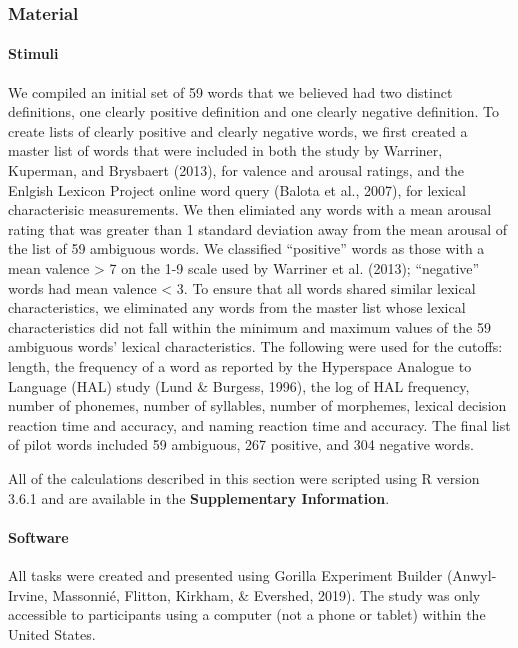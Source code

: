 \documentclass[man]{apa6}
\let\oldparagraph\paragraph
\renewcommand{\paragraph}[1]{\oldparagraph{#1}\mbox{}}
\begin{document}
\hypertarget{material}{%
\subsubsection{Material}\label{material}}

\hypertarget{stimuli}{%
\paragraph{Stimuli}\label{stimuli}}

We compiled an initial set of 59 words that we believed had two distinct definitions, one clearly positive definition and one clearly negative definition. To create lists of clearly positive and clearly negative words, we first created a master list of words that were included in both the study by Warriner, Kuperman, and Brysbaert (2013), for valence and arousal ratings, and the Enlgish Lexicon Project online word query (Balota et al., 2007), for lexical characterisic measurements. We then elimiated any words with a mean arousal rating that was greater than 1 standard deviation away from the mean arousal of the list of 59 ambiguous words. We classified \enquote{positive} words as those with a mean valence \textgreater{} 7 on the 1-9 scale used by Warriner et al. (2013); \enquote{negative} words had mean valence \textless{} 3. To ensure that all words shared similar lexical characteristics, we eliminated any words from the master list whose lexical characteristics did not fall within the minimum and maximum values of the 59 ambiguous words' lexical characteristics. The following were used for the cutoffs: length, the frequency of a word as reported by the Hyperspace Analogue to Language (HAL) study (Lund \& Burgess, 1996), the log of HAL frequency, number of phonemes, number of syllables, number of morphemes, lexical decision reaction time and accuracy, and naming reaction time and accuracy. The final list of pilot words included 59 ambiguous, 267 positive, and 304 negative words.

All of the calculations described in this section were scripted using R version 3.6.1 and are available in the \textbf{Supplementary Information}.

\hypertarget{software}{%
\paragraph{Software}\label{software}}

All tasks were created and presented using Gorilla Experiment Builder (Anwyl-Irvine, Massonnié, Flitton, Kirkham, \& Evershed, 2019). The study was only accessible to participants using a computer (not a phone or tablet) within the United States.
\end{document}
